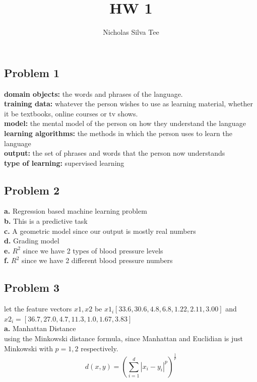 \documentclass[letter]{article}
\title{HW 1}
\author{Nicholas Silva Tee}
\theoremstyle{case}
\begin{document}
\subsection*{Problem 1}
\textbf{domain objects:} the words and phrases of the language.   \\
\textbf{training data:} whatever the person wishes to use as learning material, whether it be textbooks, online courses or tv shows. \\
\textbf{model:} the mental model of the person on how they understand the language \\
\textbf{learning algorithms:} the methods in which the person uses to learn the language \\
\textbf{output:} the set of phrases and words that the person now understands  \\
\textbf{type of learning:} supervised learning\\

\subsection*{Problem 2}
\textbf{a. } Regression based machine learning problem \\
\textbf{b. } This is a predictive task \\
\textbf{c. } A geometric model since our output is mostly real numbers\\
\textbf{d. } Grading model \\
\textbf{e. } $R^2$ since we have 2 types of blood pressure levels\\
\textbf{f. } $R^2$ since we have 2 different blood pressure numbers
\newpage
\subsection*{Problem 3}
let the feature vectors $x1, x2$ be  $x1_i [33.6,30.6,4.8,6.8,1.22,2.11,3.00]$ and $x2_i = [36.7,27.0,4.7,11.3,1.0,1.67,3.83]$ \\ 
\textbf{a. } Manhattan Distance \\
using the Minkowski distance formula, since Manhattan and Euclidian is just Minkowski with $p = 1, 2$ respectively.
\[
	 d(x,y) = \left( \sum_{i=1}^{d} |x_i-y_i|^p \right)^\frac{1}{p}
\]
\end{document}
